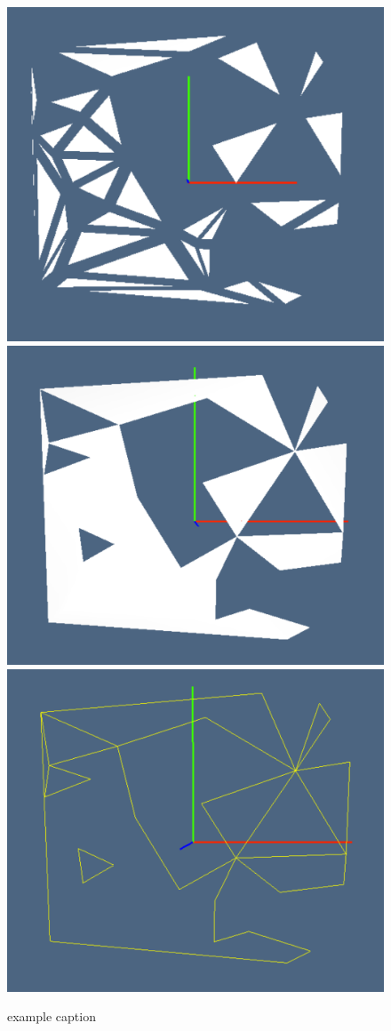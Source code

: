 \documentclass[11pt,oneside]{article}    %
\begin{document}
\begin{figure}[htbp] %
   \centering
   \includegraphics[height=0.25\linewidth,width=0.32\linewidth]{images/tria0} 
   \includegraphics[height=0.25\linewidth,width=0.32\linewidth]{images/tria1} 
   \includegraphics[height=0.25\linewidth,width=0.32\linewidth]{images/tria2} 
   \caption{example caption}
   \label{fig:example}
\end{figure}
\end{document}
